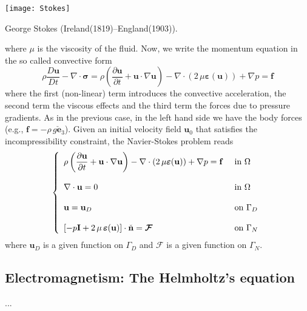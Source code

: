 \begin{marginfigure}[3.0cm]
	\texttt{[image: Stokes]}
	\caption[]{George Stokes (Ireland(1819)--England(1903)).} 
\end{marginfigure}
where $\mu$ is the viscosity of the fluid. Now, we write the momentum equation in the so called convective form
\begin{equation}
\rho\dfrac{D{\mathbf{u}}}{Dt} - \nabla \cdot\boldsymbol{\sigma} =  
\rho\left (\dfrac{\partial{\mathbf{u}}}{\partial{t}} +  \mathbf{u} \cdot \nabla \mathbf{u}\right ) 
- \nabla \cdot ( 2 \, \mu \boldsymbol{\varepsilon}(\mathbf{u})) + \nabla{p} = \mathbf{f}
\end{equation}
where the first (non-linear) term introduces the convective acceleration, the second term
the viscous effects and the third term the forces due to pressure gradients. As in the previous
case, in the left hand side we have the body forces (e.g., $\mathbf{f} = -\rho \, g  \check{\mathbf{e}}_3$).
Given an initial velocity field $\mathbf{u}_0$ that satisfies the incompressibility constraint,
the Navier-Stokes problem reads
\begin{equation}
\labeq{navierstokes}
\left\{
\begin{array}{ll}
\rho\left (\dfrac{\partial{\mathbf{u}}}{\partial{t}} +  \mathbf{u} \cdot \nabla \mathbf{u}\right )
- \nabla \cdot ( 2 \, \mu \boldsymbol{\varepsilon}(\mathbf{u})) + \nabla{p} = \mathbf{f} & \mbox{ in } \Omega \\
& \\
\nabla \cdot \mathbf{u} = 0  & \mbox{ in } \Omega \\
& \\
\mathbf{u} = \mathbf{u}_D & \mbox{ on } \Gamma_D \\
& \\
\left [-p\mathbf{I} + 2\,\mu\, \boldsymbol{\varepsilon}(\mathbf{u}) \right ] \cdot \check{\mathbf{n}} = \boldsymbol{\mathcal{F}} & \mbox{ on } \Gamma_N
\end{array}
\right.
\end{equation}
where $\mathbf{u}_D$ is a given function on $\Gamma_D$ and $\boldsymbol{\mathcal{F}}$ is
a given function on $\Gamma_N$.


\subsection{Electromagnetism: The Helmholtz's equation}

...

